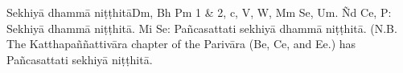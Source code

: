 \begin{outro}
	Sekhiyā dhammā niṭṭhitā\makeatletter\hyperlink{endnote-appendix}\makeatother Dm, Bh Pm 1 & 2, c, V, W, Mm Se, Um. Ñd Ce, P: Sekhiyā dhammā niṭṭhitā. Mi Se: Pañcasattati sekhiyā dhammā niṭṭhitā.
(N.B. The Katthapaññattivāra chapter of the Parivāra (Be, Ce, and Ee.) has Pañcasattati sekhiyā niṭṭhitā.
\end{outro}

\clearpage

